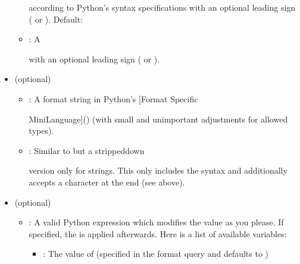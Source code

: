 \documentclass[letterpaper,12pt,english]{sphinxmanual}
\begin{document}
\begin{itemize}
\begin{itemize}
according to Python’s syntax specifications with an optional
leading sign (\sphinxcode{\sphinxupquote{\sphinxhyphen{}}} or \sphinxcode{\sphinxupquote{+}}). Default: 

\item {} 
: A


with an optional leading sign (\sphinxcode{\sphinxupquote{\sphinxhyphen{}}} or \sphinxcode{\sphinxupquote{+}}).

\end{itemize}

\item {} 
 (optional)
\begin{itemize}
\item {} 
: A format string in Python’s {[}Format Specific

Mini\sphinxhyphen{}Language{]}()
(with small and unimportant adjustments for allowed types).

\item {} 
: Similar to  but a stripped\sphinxhyphen{}down

version only for strings. This only includes the
\sphinxcode{\sphinxupquote{{[}{[}fill{]}align{]}{[}width{]}}} syntax and additionally accepts a 
character at the end (see above).

\end{itemize}

\item {} 
 (optional)
\begin{itemize}
\item {} 
: A valid Python expression which modifies the value
as you please. If specified, the  is applied
afterwards. Here is a list of available variables:
\begin{itemize}
\item {} 
: The value of  (specified in the format query and
defaults to )


\end{itemize}
\end{itemize}
\end{itemize}
\end{document}
